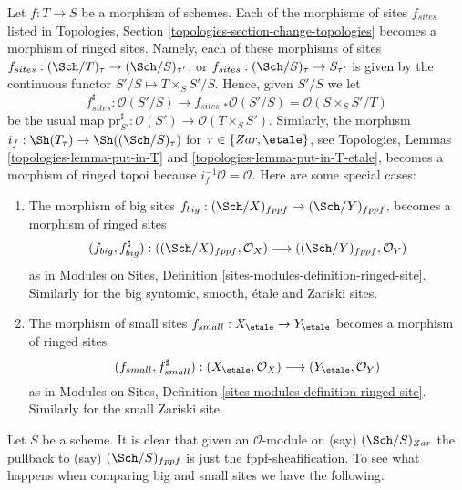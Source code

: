 \begin{remark}
\label{remark-change-topologies-ringed}
Let $f : T \to S$ be a morphism of schemes.
Each of the morphisms of sites $f_{sites}$ listed in
Topologies, Section \ref{topologies-section-change-topologies}
becomes a morphism of ringed sites. Namely, each of these morphisms of sites
$f_{sites} : (\Sch/T)_\tau \to (\Sch/S)_{\tau'}$, or
$f_{sites} : (\Sch/S)_\tau \to S_{\tau'}$ is given by the continuous
functor $S'/S \mapsto T \times_S S'/S$. Hence, given $S'/S$ we let
$$
f_{sites}^\sharp :
\mathcal{O}(S'/S)
\longrightarrow
f_{sites, *}\mathcal{O}(S'/S) =
\mathcal{O}(S \times_S S'/T)
$$
be the usual map
$\text{pr}_{S'}^\sharp : \mathcal{O}(S') \to \mathcal{O}(T \times_S S')$.
Similarly, the morphism
$i_f : \Sh(T_\tau) \to \Sh((\Sch/S)_\tau)$
for $\tau \in \{Zar, \etale\}$, see
Topologies, Lemmas \ref{topologies-lemma-put-in-T} and
\ref{topologies-lemma-put-in-T-etale},
becomes a morphism of ringed topoi because $i_f^{-1}\mathcal{O} = \mathcal{O}$.
Here are some special cases:
\begin{enumerate}
\item The morphism of big sites
$f_{big} : (\Sch/X)_{fppf} \to (\Sch/Y)_{fppf}$,
becomes a morphism of ringed sites
$$
(f_{big}, f_{big}^\sharp) :
((\Sch/X)_{fppf}, \mathcal{O}_X)
\longrightarrow
((\Sch/Y)_{fppf}, \mathcal{O}_Y)
$$
as in Modules on Sites, Definition \ref{sites-modules-definition-ringed-site}.
Similarly for the big syntomic, smooth, \'etale and Zariski sites.
\item The morphism of small sites
$f_{small} : X_\etale \to Y_\etale$
becomes a morphism of ringed sites
$$
(f_{small}, f_{small}^\sharp) :
(X_\etale, \mathcal{O}_X)
\longrightarrow
(Y_\etale, \mathcal{O}_Y)
$$
as in Modules on Sites, Definition \ref{sites-modules-definition-ringed-site}.
Similarly for the small Zariski site.
\end{enumerate}
\end{remark}

\noindent
Let $S$ be a scheme. It is clear that given an $\mathcal{O}$-module on (say)
$(\Sch/S)_{Zar}$ the pullback to (say) $(\Sch/S)_{fppf}$
is just the fppf-sheafification. To see what happens when comparing
big and small sites we have the following.

